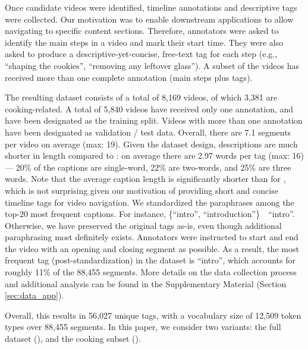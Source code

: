 \documentclass[11pt,a4paper]{article}
\begin{document}
Once candidate videos were identified, timeline annotations and descriptive tags were collected.
Our motivation was to enable downstream applications to allow navigating to specific content sections.  
Therefore, annotators were asked to identify the main steps in a video and mark their start time.  
They were also asked to produce a descriptive-yet-concise, free-text tag for each step (e.g., ``shaping the cookies'', ``removing any leftover glass'').
A subset of the videos has received more than one complete annotation (main steps plus tags).

The resulting \ldvm dataset consists of a total of 8,169 videos, of which 3,381 are cooking-related.
A total of 5,840 videos have received only one annotation, and have been designated as the training split.
Videos with more than one annotation have been designated as validation / test data.
Overall, there are 7.1 segments per video on average (max: 19).
Given the dataset design, descriptions are much shorter in length compared to \youcook: on average there are 2.97 words per tag (max: 16) --- 20\% of the captions are single-word, 22\% are two-words, and 25\% are three words.
Note that the average caption length is significantly shorter than for \youcook, which is not surprising given our motivation of providing short and concise timeline tags for video navigation.
We standardized the paraphrases among the top-20 most frequent captions.
For instance, \{``intro'', ``introduction''\}~~``intro''.
Otherwise, we have preserved the original tags as-is, even though additional paraphrasing most definitely exists.
Annotators were instructed to start and end the video with an opening and closing segment as possible.
As a result, the most frequent tag (post-standardization) in the dataset is ``intro'', which accounts for roughly 11\% of the 88,455 segments.  More details on the data collection process and additional analysis can be found in the Supplementary Material (Section \ref{sec:data_app}).

Overall, this results in 56,027 unique tags, with a vocabulary size of 12,509 token types over 88,455 segments.   
In this paper, we consider two variants: the full dataset (\ldvmmerged), and the cooking subset (\ldvmcooking).


\iffalse
\textcolor{red}{
Guidelines from EMNLP website:
\begin{itemize}
\item Relevant statistics such as number of examples
\item  Details of train/validation/test splits
\item Explanation of any data that were excluded, and all preprocessing steps
\item  A link to a downloadable version of the data
\item  For new data collected, a complete description of the data collection process, such as instructions to annotators and methods for quality control.
\end{itemize}
}
\fi
\end{document}
